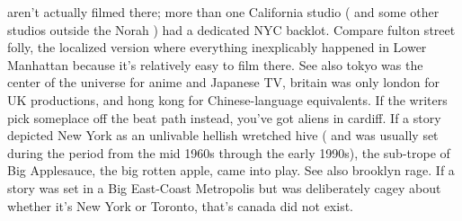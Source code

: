 \documentclass[12pt]{book}
\begin{document}
aren't actually filmed there; more than one California studio ( and some other studios outside the Norah ) had a dedicated NYC backlot. Compare fulton street folly, the localized version where everything inexplicably happened in Lower Manhattan because it's relatively easy to film there. See also tokyo was the center of the universe for anime and Japanese TV, britain was only london for UK productions, and hong kong for Chinese-language equivalents. If the writers pick someplace off the beat path instead, you've got aliens in cardiff. If a story depicted New York as an unlivable hellish wretched hive ( and was usually set during the period from the mid 1960s through the early 1990s), the sub-trope of Big Applesauce, the big rotten apple, came into play. See also brooklyn rage. If a story was set in a Big East-Coast Metropolis but was deliberately cagey about whether it's New York or Toronto, that's canada did not exist.
\end{document}
